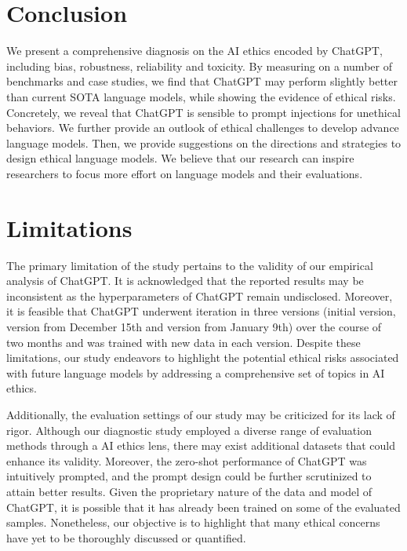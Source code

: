 \section{Conclusion}
We present a comprehensive diagnosis on the AI ethics encoded by ChatGPT, including bias, robustness, reliability and toxicity. By measuring on a number of benchmarks and case studies, we find that ChatGPT may perform slightly better than current SOTA language models, while showing the evidence of ethical risks. Concretely, we reveal that ChatGPT is sensible to prompt injections for unethical behaviors. We further provide an outlook of ethical challenges to develop advance language models. Then, we provide suggestions on the directions and strategies to design ethical language models. We believe that our research can inspire researchers to focus more effort on language models and their evaluations.


\section{Limitations}
The primary limitation of the study pertains to the validity of our empirical analysis of ChatGPT. It is acknowledged that the reported results may be inconsistent as the hyperparameters of ChatGPT remain undisclosed. Moreover, it is feasible that ChatGPT underwent iteration in three versions (initial version, version from December 15th and version from January 9th) over the course of two months and was trained with new data in each version. Despite these limitations, our study endeavors to highlight the potential ethical risks associated with future language models by addressing a comprehensive set of topics in AI ethics.

Additionally, the evaluation settings of our study may be criticized for its lack of rigor. Although our diagnostic study employed a diverse range of evaluation methods through a AI ethics lens, there may exist additional datasets that could enhance its validity. Moreover, the zero-shot performance of ChatGPT was intuitively prompted, and the prompt design could be further scrutinized to attain better results. Given the proprietary nature of the data and model of ChatGPT, it is possible that it has already been trained on some of the evaluated samples. Nonetheless, our objective is to highlight that many ethical concerns have yet to be thoroughly discussed or quantified.